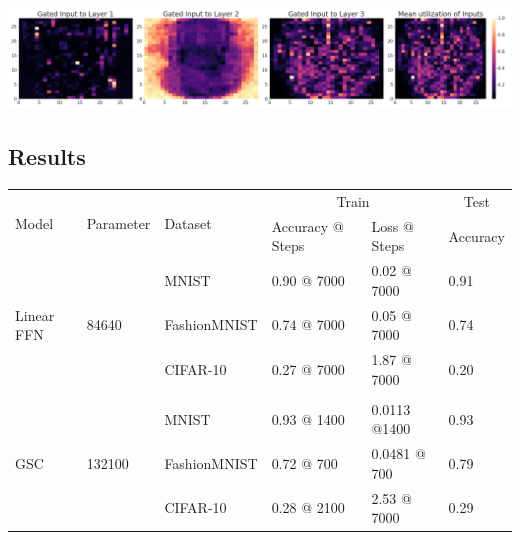 \documentclass{article}
\begin{document}
\centering
\includegraphics[scale=0.2]{paper/fashionmnist_vis.png}
\label{fig:c.score_10p_model.png}


\subsection{Results}

\begin{table}[]
\centering
\begin{tabular}{@{}llllll@{}}
\toprule
\multirow{2}{*}{Model}            & \multirow{2}{*}{Parameter}      & \multirow{2}{*}{Dataset} & \multicolumn{2}{c}{Train}                   & \multicolumn{1}{c}{Test} \\ \cmidrule(l){4-6} 
                                  &                                 &                          & Accuracy @ Steps     & Loss @ Steps         & Accuracy                 \\ \cmidrule(r){1-3}
\multirow{3}{*}{Linear FFN}       & \multirow{3}{*}{84640}          & MNIST                    & 0.90 @ 7000          & 0.02 @ 7000          & 0.91                     \\
                                  &                                 & FashionMNIST             & 0.74 @ 7000          & 0.05 @ 7000          & 0.74                     \\
                                  &                                 & CIFAR-10                 & 0.27 @ 7000          & 1.87 @ 7000          & 0.20                     \\
                                  &                                 &                          &                      &                      &                          \\
\multirow{3}{*}{GSC}              & \multirow{3}{*}{132100}         & MNIST                    & 0.93 @ 1400          & 0.0113 @1400         & 0.93                     \\
                                  &                                 & FashionMNIST             & 0.72 @ 700           & 0.0481 @ 700         & 0.79                     \\
                                  &                                 & CIFAR-10                 & 0.28 @ 2100          & 2.53 @ 7000          & 0.29                     \\

\end{tabular}
\end{table}
\end{document}
